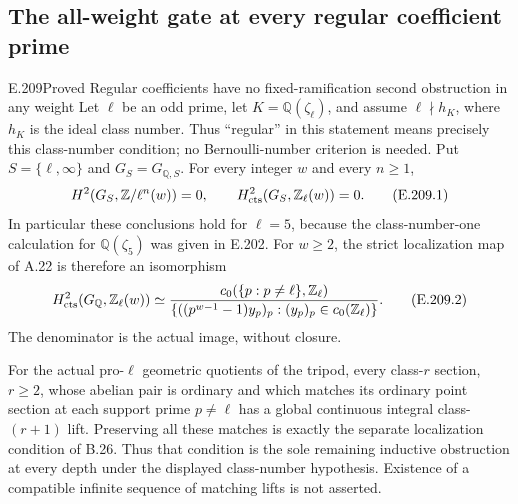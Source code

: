 \subsection{The all-weight gate at every regular coefficient prime}

\begin{result}{E.209}{Proved}
{Regular coefficients have no fixed-ramification second obstruction in any weight}
Let $\ell$ be an odd prime, let $K=\mathbb Q(\zeta_\ell)$, and
assume $\ell\nmid h_K$, where $h_K$ is the ideal class number.
Thus ``regular'' in this statement means precisely this class-number
condition; no Bernoulli-number criterion is needed. Put
$S=\{\ell,\infty\}$ and $G_S=G_{\mathbb Q,S}$.
For every integer $w$ and every $n\ge1$,
\[
 H^2(G_S,\mathbb Z/\ell^n(w))=0,
 \qquad H^2_{\rm cts}(G_S,\mathbb Z_\ell(w))=0.              \tag{E.209.1}
\]
In particular these conclusions hold for $\ell=5$, because the
class-number-one calculation for $\mathbb Q(\zeta_5)$ was given
in E.202. For $w\ge2$, the strict localization map of A.22 is
therefore an isomorphism
\[
 H^2_{\rm cts}(G_{\mathbb Q},\mathbb Z_\ell(w))
 \simeq
 \frac{c_0(\{p:p\ne\ell\},\mathbb Z_\ell)}
 {\{((p^{w-1}-1)y_p)_p:(y_p)_p\in c_0(\mathbb Z_\ell)\}}.
                                                               \tag{E.209.2}
\]
The denominator is the actual image, without closure.

For the actual pro-$\ell$ geometric quotients of the tripod, every
class-$r$ section, $r\ge2$, whose abelian pair is ordinary and
which matches its ordinary point section at each support prime
$p\ne\ell$ has a global continuous integral class-$(r+1)$ lift.
Preserving all these matches is exactly the separate localization
condition of B.26. Thus that condition is the sole remaining
inductive obstruction at every depth under the displayed
class-number hypothesis. Existence of a compatible infinite
sequence of matching lifts is not asserted.
\end{result}

